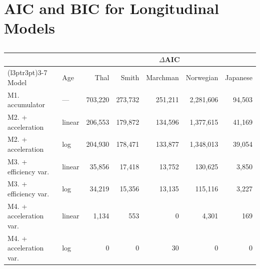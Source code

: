 \documentclass[
  11pt,
]{article}
\begin{document}
\endgroup{}

\section{AIC and BIC for Longitudinal
Models}\label{aic-and-bic-for-longitudinal-models}

\begingroup\fontsize{8}{10}\selectfont

\begin{longtable}[t]{llrrrrr}

\caption{\label{tbl-aic}}

\tabularnewline

\toprule
\multicolumn{2}{c}{ } & \multicolumn{5}{c}{$\Delta$AIC} \\
\cmidrule(l{3pt}r{3pt}){3-7}
Model & Age & Thal & Smith & Marchman & Norwegian & Japanese\\
\midrule
M1. accumulator & — & 703,220 & 273,732 & 251,211 & 2,281,606 & 94,503\\
M2. + acceleration & linear & 206,553 & 179,872 & 134,596 & 1,377,615 & 41,169\\
M2. + acceleration & log & 204,930 & 178,471 & 133,877 & 1,348,013 & 39,054\\
M3. + efficiency var. & linear & 35,856 & 17,418 & 13,752 & 130,625 & 3,850\\
M3. + efficiency var. & log & 34,219 & 15,356 & 13,135 & 115,116 & 3,227\\
\addlinespace
M4. + acceleration var. & linear & 1,134 & 553 & 0 & 4,301 & 169\\
M4. + acceleration var. & log & 0 & 0 & 30 & 0 & 0\\
\bottomrule

\end{longtable}

\endgroup{}

\begingroup\fontsize{8}{10}\selectfont
\end{document}

